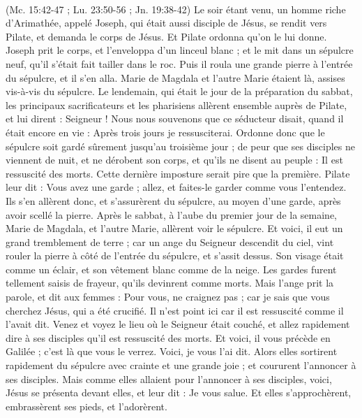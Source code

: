 \begin{multicols}{2}
{\\(Mc. 15:42-47 ; Lu. 23:50-56 ; Jn. 19:38-42)}
Le soir étant venu, un homme riche d'Arimathée, appelé Joseph, qui était aussi disciple de Jésus,
se rendit vers Pilate, et demanda le corps de Jésus. Et Pilate ordonna qu’on le lui donne.
Joseph prit le corps, et l'enveloppa d'un linceul blanc ;
et le mit dans un sépulcre neuf, qu'il s’était fait tailler dans le roc. Puis il roula une grande pierre à l'entrée du sépulcre, et il s'en alla.
Marie de Magdala et l’autre Marie étaient là, assises vis-à-vis du sépulcre.
Le lendemain, qui était le jour de la préparation du sabbat, les principaux sacrificateurs et les pharisiens allèrent ensemble auprès de Pilate,
et lui dirent : Seigneur ! Nous nous souvenons que ce séducteur disait, quand il était encore en vie : Après trois jours je ressusciterai.
Ordonne donc que le sépulcre soit gardé sûrement jusqu’au troisième jour ; de peur que ses disciples ne viennent de nuit, et ne dérobent son corps, et qu'ils ne disent au peuple : Il est ressuscité des morts. Cette dernière imposture serait pire que la première.
Pilate leur dit : Vous avez une garde ; allez, et faites-le garder comme vous l’entendez.
Ils s'en allèrent donc, et s’assurèrent du sépulcre, au moyen d’une garde, après avoir scellé la pierre.
\VerseOne{}Après le sabbat, à l’aube du premier jour de la semaine, Marie de Magdala, et l'autre Marie, allèrent voir le sépulcre.
Et voici, il eut un grand tremblement de terre ; car un ange du Seigneur descendit du ciel, vint rouler la pierre à côté de l'entrée du sépulcre, et s'assit dessus.
Son visage était comme un éclair, et son vêtement blanc comme de la neige.
Les gardes furent tellement saisis de frayeur, qu'ils devinrent comme morts.
Mais l'ange prit la parole, et dit aux femmes : Pour vous, ne craignez pas ; car je sais que vous cherchez Jésus, qui a été crucifié.
Il n'est point ici car il est ressuscité comme il l'avait dit. Venez et voyez le lieu où le Seigneur était couché,
et allez rapidement dire à ses disciples qu'il est ressuscité des morts. Et voici, il vous précède en Galilée ; c’est là que vous le verrez. Voici, je vous l’ai dit.
Alors elles sortirent rapidement du sépulcre avec crainte et une grande joie ; et coururent l'annoncer à ses disciples.
Mais comme elles allaient pour l'annoncer à ses disciples, voici, Jésus se présenta devant elles, et leur dit : Je vous salue. Et elles s'approchèrent, embrassèrent ses pieds, et l'adorèrent.

\end{multicols}
